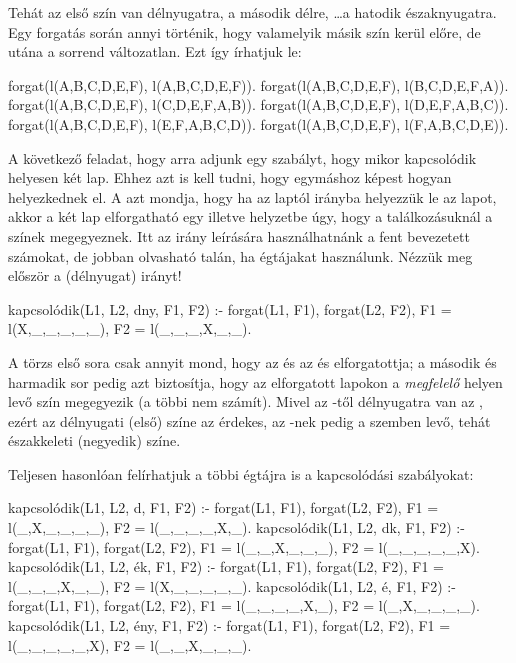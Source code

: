 Tehát az első szín van délnyugatra, a második délre,
\dots a hatodik északnyugatra. Egy forgatás során
annyi történik, hogy valamelyik másik szín kerül
előre, de utána a sorrend változatlan. Ezt így
írhatjuk le:
\begin{program}
forgat(l(A,B,C,D,E,F), l(A,B,C,D,E,F)).
forgat(l(A,B,C,D,E,F), l(B,C,D,E,F,A)).
forgat(l(A,B,C,D,E,F), l(C,D,E,F,A,B)).
forgat(l(A,B,C,D,E,F), l(D,E,F,A,B,C)).
forgat(l(A,B,C,D,E,F), l(E,F,A,B,C,D)).
forgat(l(A,B,C,D,E,F), l(F,A,B,C,D,E)).
\end{program}

A következő feladat, hogy arra adjunk egy szabályt,
hogy mikor kapcsolódik helyesen két lap. Ehhez azt
is kell tudni, hogy egymáshoz képest hogyan
helyezkednek el. A  azt mondja, hogy ha az  laptól
 irányba helyezzük le az  lapot,
akkor a két lap elforgatható egy  illetve
 helyzetbe úgy, hogy a találkozásuknál a
színek megegyeznek. Itt az irány leírására
használhatnánk a fent bevezetett számokat, de jobban
olvasható talán, ha égtájakat használunk. Nézzük meg
először a  (délnyugat) irányt!
\begin{program}
kapcsolódik(L1, L2, dny, F1, F2) :-
    forgat(L1, F1), forgat(L2, F2),
    F1 = l(X,_,_,_,_,_),
    F2 = l(_,_,_,X,_,_).
\end{program}
A törzs első sora csak annyit mond, hogy az 
és  az  és  elforgatottja; a
második és harmadik sor pedig azt biztosítja, hogy
az elforgatott lapokon a \emph{megfelelő} helyen
levő szín megegyezik (a többi nem számít). Mivel az
-től délnyugatra van az , ezért az
 délnyugati (első) színe az érdekes, az
-nek pedig a szemben levő, tehát északkeleti
(negyedik) színe.

Teljesen hasonlóan felírhatjuk a többi égtájra is a
kapcsolódási szabályokat:
\begin{program}
kapcsolódik(L1, L2, d, F1, F2) :-
    forgat(L1, F1), forgat(L2, F2),
    F1 = l(_,X,_,_,_,_),
    F2 = l(_,_,_,_,X,_).
kapcsolódik(L1, L2, dk, F1, F2) :-
    forgat(L1, F1), forgat(L2, F2),
    F1 = l(_,_,X,_,_,_),
    F2 = l(_,_,_,_,_,X).
kapcsolódik(L1, L2, ék, F1, F2) :-
    forgat(L1, F1), forgat(L2, F2),
    F1 = l(_,_,_,X,_,_),
    F2 = l(X,_,_,_,_,_).
kapcsolódik(L1, L2, é, F1, F2) :-
    forgat(L1, F1), forgat(L2, F2),
    F1 = l(_,_,_,_,X,_),
    F2 = l(_,X,_,_,_,_).
kapcsolódik(L1, L2, ény, F1, F2) :-
    forgat(L1, F1), forgat(L2, F2),
    F1 = l(_,_,_,_,_,X),
    F2 = l(_,_,X,_,_,_).
\end{program}

